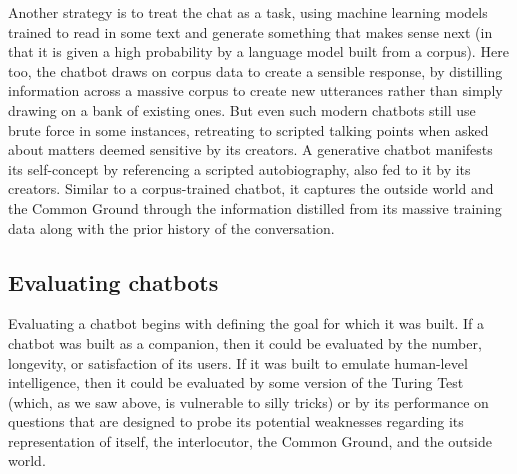 Another strategy is to treat the chat as a  task, using machine learning models trained to read in some text and generate something that makes sense next (in that it is given a high probability by a language model built from a corpus).  Here too, the chatbot draws on corpus data to create a sensible response, by distilling information across a massive corpus to create new utterances rather than simply drawing on a bank of existing ones.  But even such modern chatbots still use brute force in some instances, retreating to scripted talking points when asked about matters deemed sensitive by its creators.  A generative chatbot manifests its self-concept by referencing a scripted autobiography, also fed to it by its creators.  Similar to a corpus-trained chatbot, it captures the outside world and the Common Ground through the information distilled from its massive training data along with the prior history of the conversation.









\subsection{Evaluating chatbots}

Evaluating a chatbot begins with defining the goal for which it was built.  If a chatbot was built as a companion, then it could be evaluated by the number, longevity, or satisfaction of its users.  If it was built to emulate human-level intelligence, then it could be evaluated by some version of the Turing Test (which, as we saw above, is vulnerable to silly tricks) or by its performance on questions that
are designed to
probe its potential weaknesses regarding its representation of itself, the interlocutor, the Common Ground, and the outside world.

